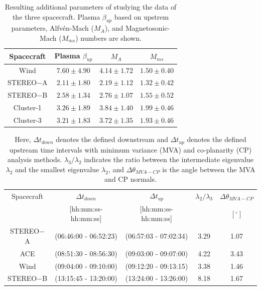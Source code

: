\documentclass[draft]{agujournal2019}
\begin{document}
\pagebreak

\begin{table}[h]
\centering
\caption{Resulting additional parameters of studying the data of the three spacecraft. Plasma $\beta_{up}$ based on upstrem parameters, Alfvén-Mach ($M_{A}$), and Magnetosonic-Mach ($M_{ms}$) numbers are shown. \label{tab:core4}}
\begin{tabular}{cccc}
\hline
Spacecraft & Plasma $\beta_{up}$ & $M_{A}$ & $M_{ms}$ \\
\hline
Wind & $7.60\pm 4.90$      & $4.14\pm 1.72$ & $1.50\pm 0.40$ \\
STEREO$-$A & $2.11\pm 1.80$   & $2.19\pm 1.12$ & $1.32\pm 0.42$ \\
STEREO$-$B & $2.58\pm 1.34$    & $2.76\pm 1.07$ & $1.55\pm 0.52$ \\
Cluster-1 & $3.26\pm 1.89$   & $3.84\pm 1.40$ & $1.99\pm 0.46$ \\
Cluster-3 & $3.21\pm 1.83$   & $3.72\pm 1.35$ & $1.93\pm 0.46$ \\
\end{tabular}
\end{table}

\pagebreak

\begin{table}[h]
\centering
\caption{Here, $\Delta t_{down}$ denotes the defined downstream and $\Delta t_{up}$ denotes the defined upstream time intervals with minimum variance (MVA) and co-planarity (CP) analysis methods. $\lambda_{3}/\lambda_{2}$ indicates the ratio between the intermediate eigenvalue $\lambda_{2}$ and the smallest eigenvalue $\lambda_{2}$, and $\Delta\theta_{MVA-CP}$ is the angle between the MVA and CP normals.\label{tab:timeintervalsapril}}
\begin{tabular}{ccccc}
\hline
 Spacecraft & $\Delta t_{down}$ & $\Delta t_{up}$ & $\lambda_{2}/\lambda_{3}$ & $\Delta\theta_{MVA-CP}$ \\
& [hh:mm:ss-hh:mm:ss] & [hh:mm:ss-hh:mm:ss] &  & $\left[{}^{\circ}\right]$\\
\hline
STEREO$-$A & (06:46:00 - 06:52:23) & (06:57:03 - 07:02:34) & 3.29 & 1.07\\ 
ACE & (08:51:30 - 08:56:30)& (09:03:00 - 09:07:00)& 4.22 & 3.43\\ 
Wind & (09:04:00 - 09:10:00)& (09:12:20 - 09:13:15)& 3.38 & 1.46\\ 
STEREO$-$B & (13:15:45 - 13:20:00)& (13:24:00 - 13:26:00)& 8.18 & 1.67\\ 
\end{tabular}
\end{table}
\end{document}
